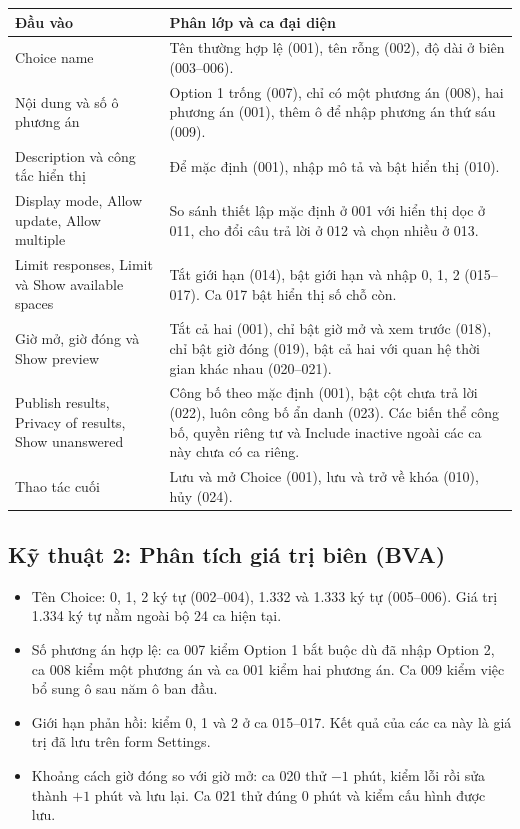 \begin{longtable}{|L{4.8cm}|L{9.5cm}|}
\hline
\textbf{Đầu vào} & \textbf{Phân lớp và ca đại diện}\\ \hline
Choice name & Tên thường hợp lệ (001), tên rỗng (002), độ dài ở biên (003--006).\\ \hline
Nội dung và số ô phương án & Option 1 trống (007), chỉ có một phương án (008), hai phương án (001), thêm ô để nhập phương án thứ sáu (009).\\ \hline
Description và công tắc hiển thị & Để mặc định (001), nhập mô tả và bật hiển thị (010).\\ \hline
Display mode, Allow update, Allow multiple & So sánh thiết lập mặc định ở 001 với hiển thị dọc ở 011, cho đổi câu trả lời ở 012 và chọn nhiều ở 013.\\ \hline
Limit responses, Limit và Show available spaces & Tắt giới hạn (014), bật giới hạn và nhập 0, 1, 2 (015--017). Ca 017 bật hiển thị số chỗ còn.\\ \hline
Giờ mở, giờ đóng và Show preview & Tắt cả hai (001), chỉ bật giờ mở và xem trước (018), chỉ bật giờ đóng (019), bật cả hai với quan hệ thời gian khác nhau (020--021).\\ \hline
Publish results, Privacy of results, Show unanswered & Công bố theo mặc định (001), bật cột chưa trả lời (022), luôn công bố ẩn danh (023). Các biến thể công bố, quyền riêng tư và Include inactive ngoài các ca này chưa có ca riêng.\\ \hline
Thao tác cuối & Lưu và mở Choice (001), lưu và trở về khóa (010), hủy (024).\\ \hline
\end{longtable}

\subsection{Kỹ thuật 2: Phân tích giá trị biên (BVA)}
\begin{itemize}[noitemsep]
\item Tên Choice: 0, 1, 2 ký tự (002--004), 1.332 và 1.333 ký tự (005--006). Giá trị 1.334 ký tự nằm ngoài bộ 24 ca hiện tại.
\item Số phương án hợp lệ: ca 007 kiểm Option 1 bắt buộc dù đã nhập Option 2, ca 008 kiểm một phương án và ca 001 kiểm hai phương án. Ca 009 kiểm việc bổ sung ô sau năm ô ban đầu.
\item Giới hạn phản hồi: kiểm 0, 1 và 2 ở ca 015--017. Kết quả của các ca này là giá trị đã lưu trên form Settings.
\item Khoảng cách giờ đóng so với giờ mở: ca 020 thử $-1$ phút, kiểm lỗi rồi sửa thành $+1$ phút và lưu lại. Ca 021 thử đúng 0 phút và kiểm cấu hình được lưu.
\end{itemize}

